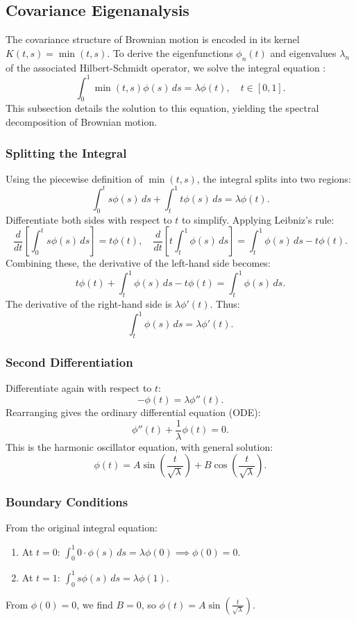 \documentclass[12pt]{report}
\begin{document}
\subsection{Covariance Eigenanalysis}  
The covariance structure of Brownian motion is encoded in its kernel \(K(t, s) = \min(t, s)\). To derive the eigenfunctions \(\phi_n(t)\) and eigenvalues \(\lambda_n\) of the associated Hilbert-Schmidt operator, we solve the integral equation \cite{karatzas}:  
\[
\int_0^1 \min(t, s) \phi(s) \, ds = \lambda \phi(t), \quad t \in [0, 1].
\]
This subsection details the solution to this equation, yielding the spectral decomposition of Brownian motion.

\subsubsection{Splitting the Integral}  
Using the piecewise definition of \(\min(t, s)\), the integral splits into two regions:  
\[
\int_0^t s \phi(s) \, ds + \int_t^1 t \phi(s) \, ds = \lambda \phi(t).
\]
Differentiate both sides with respect to \(t\) to simplify. Applying Leibniz’s rule:  
\[
\frac{d}{dt} \left[\int_0^t s \phi(s) \, ds\right] = t \phi(t), \quad \frac{d}{dt} \left[t \int_t^1 \phi(s) \, ds\right] = \int_t^1 \phi(s) \, ds - t \phi(t).
\]
Combining these, the derivative of the left-hand side becomes:  
\[
t \phi(t) + \int_t^1 \phi(s) \, ds - t \phi(t) = \int_t^1 \phi(s) \, ds.
\]
The derivative of the right-hand side is \(\lambda \phi'(t)\). Thus:  
\[
\int_t^1 \phi(s) \, ds = \lambda \phi'(t).
\]

\subsubsection{Second Differentiation}  
Differentiate again with respect to \(t\):  
\[
-\phi(t) = \lambda \phi''(t).
\]
Rearranging gives the ordinary differential equation (ODE):  
\[
\phi''(t) + \frac{1}{\lambda} \phi(t) = 0.
\]
This is the harmonic oscillator equation, with general solution:  
\[
\phi(t) = A \sin\left(\frac{t}{\sqrt{\lambda}}\right) + B \cos\left(\frac{t}{\sqrt{\lambda}}\right).
\]

\subsubsection{Boundary Conditions}  
From the original integral equation:  
\begin{enumerate}[label=(\roman*)]
    \item At \(t = 0\): \(\int_0^1 0 \cdot \phi(s) \, ds = \lambda \phi(0) \implies \phi(0) = 0\).  
    \item At \(t = 1\): \(\int_0^1 s \phi(s) \, ds = \lambda \phi(1)\).  
\end{enumerate}
From \(\phi(0) = 0\), we find \(B = 0\), so \(\phi(t) = A \sin\left(\frac{t}{\sqrt{\lambda}}\right)\).  
\end{document}
